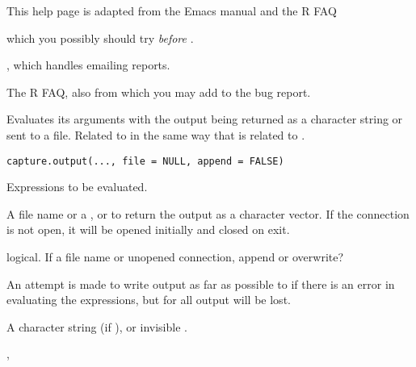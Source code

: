 %
\begin{Author}\relax
This help page is adapted from the Emacs manual and the R FAQ
\end{Author}
%
\begin{SeeAlso}\relax
{} which you possibly should try
\emph{before} .

, which handles emailing reports.

The R FAQ, also  from which you may add
to the bug report.
\end{SeeAlso}
%
\begin{Description}\relax
Evaluates its arguments with the output being returned as a character
string or sent to a file.  Related to  in the same
way that  is related to .
\end{Description}
%
\begin{Usage}
\begin{verbatim}
capture.output(..., file = NULL, append = FALSE)
\end{verbatim}
\end{Usage}
%
\begin{Arguments}
\begin{ldescription}
\item[\code{...}] Expressions to be evaluated.
\item[\code{file}] A file name or a , or  to return
the output as a character vector.  If the connection is not open,
it will be opened initially and closed on exit.
\item[\code{append}] logical.  If  a file name or unopened
connection, append or overwrite?
\end{ldescription}
\end{Arguments}
%
\begin{Details}\relax
An attempt is made to write output as far as possible to 
if there is an error in evaluating the expressions, but for
 all output will be lost.
\end{Details}
%
\begin{Value}
A character string (if ), or invisible .
\end{Value}
%
\begin{SeeAlso}\relax
 ,  
\end{SeeAlso}
